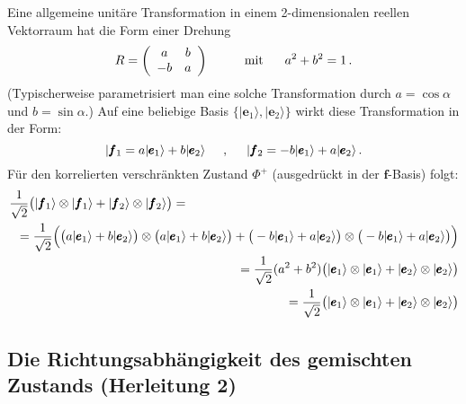 Eine allgemeine unit\"are Transformation in einem 2-dimensionalen reellen
Vektorraum hat die Form einer Drehung
\begin{equation}
             R = \left( \begin{array}{cc} a & b \\ - b & a \end{array} \right)
             \hspace{1cm} {\rm mit} \hspace{0.6cm}  a^2 + b^2 = 1 \, . 
\end{equation}
(Typischerweise parametrisiert man eine solche Transformation durch $a=\cos \alpha$ und
$b=\sin \alpha$.)
Auf eine beliebige Basis $\{ |\pmb{e}_1 \rangle, |\pmb{e}_2\rangle\}$ wirkt diese Transformation
in der Form:
\begin{equation}
    | \pmb{f}_1 = a | \pmb{e}_1 \rangle + b |\pmb{e}_2 \rangle \hspace{0.5cm} , \hspace{0.5cm}
     | \pmb{f}_2 = -b | \pmb{e}_1\rangle + a |\pmb{e}_2 \rangle \, . 
\end{equation}
F\"ur den korrelierten verschr\"ankten Zustand $\Phi^+$ (ausgedr\"uckt in der $\pmb{f}$-Basis) folgt:
\begin{eqnarray}
    \frac{1}{\sqrt{2}} \big(  | \pmb{f}_1 \rangle \otimes | \pmb{f}_1 \rangle + 
        | \pmb{f}_2 \rangle \otimes | \pmb{f}_2 \rangle \big)  & = & \\ 
        & &  \hspace*{-5cm} =
    \frac{1}{\sqrt{2}} \Big(  \big( a | \pmb{e}_1 \rangle + b |\pmb{e}_2 \rangle \big) 
        \otimes  \big(  a | \pmb{e}_1\rangle + b |\pmb{e}_2 \rangle \big)
         +  \big( -b | \pmb{e}_1\rangle + a |\pmb{e}_2 \rangle \big) 
            \otimes \big(  -b | \pmb{e}_1 \rangle + a |\pmb{e}_2 \rangle \big)  \Big)       \\   
        & &  \hspace*{-5cm} =
  \frac{1}{\sqrt{2}} ( a^2 + b^2) \big( | \pmb{e}_1 \rangle \otimes | \pmb{e}_1 \rangle +
        | \pmb{e}_2 \rangle \otimes | \pmb{e}_2 \rangle \big)  \\
                & &  \hspace*{-5cm} =
  \frac{1}{\sqrt{2}} \big( | \pmb{e}_1 \rangle \otimes | \pmb{e}_1 \rangle + 
        | \pmb{e}_2 \rangle \otimes | \pmb{e}_2 \rangle \big)  
\end{eqnarray}

\subsection*{Die Richtungsabh\"angigkeit des gemischten Zustands (Herleitung 2)}
\label{sec_Entanglement_B}


